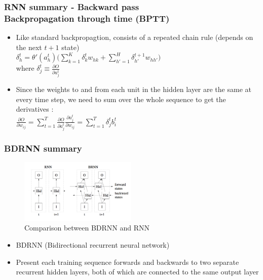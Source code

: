 \documentclass{beamer}
\begin{document}
{
    \frametitle{RNN summary - Backward pass \\ Backpropagation through time (BPTT)}
    \begin{itemize}
        \item Like standard backpropagtion, consists of a repeated chain rule (depends on the next $t+1$ state) \\ 
            \vspace{0.1in}
            $ \delta_h^t = \theta'(a_h^t) \Big( \sum_{k=1}^K \delta_k^t w_{hk} + 
            \sum_{h'=1}^H \delta_{h'}^{t+1} w_{hh'} \Big)$ \\
            \vspace{0.1in}
            where $\delta_j^t \equiv \frac{\partial O}{\partial a_j^t} $
        \item Since the weights to and from each unit in the hidden layer are the same at every time step, 
            we need to sum over the whole sequence to get the derivatives : \\
            \vspace{0.1in}
            $ \frac{\partial O}{\partial w_{ij}} = \sum_{t=1}^T \frac{\partial O}{\partial a_j^t} \frac{\partial a_j^t}{\partial w_{ij}} = \sum_{t=1}^T \delta_j^t b_i^t $
    \end{itemize}
}
\frame
{
    \frametitle{BDRNN summary}
	\begin{figure}[ht]  
		\begin{center}
			\includegraphics[width=2.2in]{Images/BDRNN_RNN.png}   
		\end{center}   
		\caption{Comparison between BDRNN and RNN}
	\end{figure}
    \begin{itemize}
        \item BDRNN (Bidirectional recurrent neural network) 
        \item Present each training sequence forwards and backwards to two separate recurrent hidden layers, 
            both of which are connected to the same output layer
    \end{itemize}
}
\frame
\end{document}
